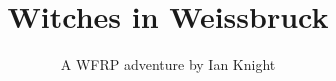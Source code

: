 \documentclass{wfrp}
\begin{document}
\title{Witches in Weissbruck}
\author{A WFRP adventure by Ian Knight}
\date{}
\maketitle

\tableofcontents


\end{document}

